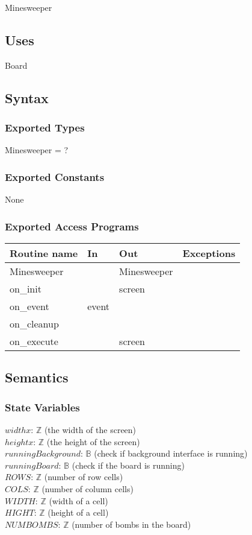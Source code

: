 \documentclass[12pt]{article}
\begin{document}
Minesweeper

\subsection {Uses}

Board

\subsection {Syntax}

\subsubsection {Exported Types}

Minesweeper = ?

\subsubsection {Exported Constants}

None

\subsubsection {Exported Access Programs}

\begin{tabular}{| l | l | l | p{5cm} |}
\hline
\textbf{Routine name} & \textbf{In} & \textbf{Out} & \textbf{Exceptions}\\
\hline
Minesweeper & ~ & Minesweeper & ~\\
\hline
on\_init & ~ & screen & ~\\
\hline
on\_event & event & ~&\\
\hline
on\_cleanup & ~ & ~ & ~ \\
\hline
on\_execute & ~ & screen& \\
\hline
\end{tabular}

\subsection {Semantics}

\subsubsection {State Variables}

$widthx$: $\mathbb{Z}$ (the width of the screen)\\
$heightx$: $\mathbb{Z}$ (the height of the screen)\\
$runningBackground$: $\mathbb{B}$ (check if background interface is running)\\
$runningBoard$: $\mathbb{B}$ (check if the board is running)\\
$ROWS$: $\mathbb{Z}$ (number of row cells)\\
$COLS$: $\mathbb{Z}$ (number of column cells)\\
$WIDTH$: $\mathbb{Z}$ (width of a cell)\\
$HIGHT$: $\mathbb{Z}$ (height of a cell)\\
$NUMBOMBS$: $\mathbb{Z}$ (number of bombs in the board)
\end{document}
